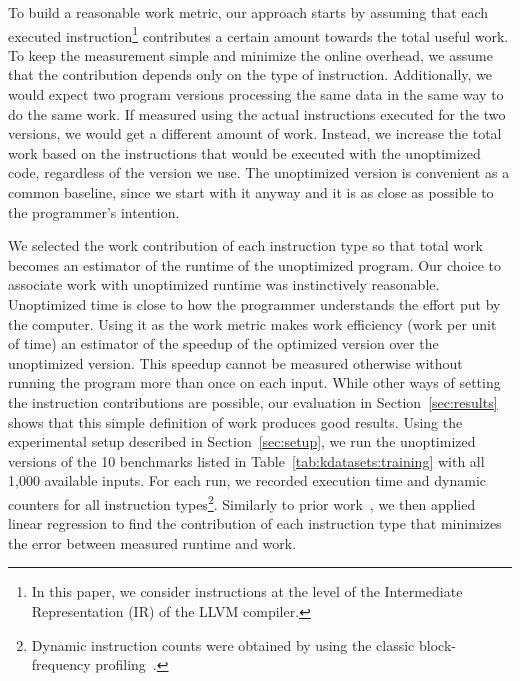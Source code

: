     To build a reasonable work metric, our approach starts by assuming that each executed instruction\footnote{In this paper, we consider instructions at the level of the Intermediate Representation (IR) of the LLVM compiler.} contributes a certain amount towards
    the total useful work. To keep the measurement simple and minimize the online overhead, we assume that the contribution depends only on
    the type of instruction. Additionally, we would expect two program versions processing the same data in the same way to do the same
    work. If measured using the actual instructions executed for the two versions, we would get a different amount of work. Instead, we
    increase the total work based on the instructions that would be executed with the unoptimized code, regardless of the version we use.
    The unoptimized version is convenient as a common baseline, since we start with it anyway and it is as close as possible to the
    programmer's intention.

    We selected the work contribution of each instruction type so that total work becomes an estimator of the runtime of the unoptimized
    program.
    Our choice to associate work with unoptimized runtime was instinctively reasonable.
    Unoptimized time is
    close to how the programmer understands the effort put by the computer. Using it as the work metric makes work efficiency (work per unit
    of time) an estimator of the speedup of the optimized version over the unoptimized version. This speedup cannot be measured otherwise without
    running the program more than once on each input. While other ways of setting the instruction contributions are possible, our evaluation in
    Section~\ref{sec:results} shows that this simple definition of work produces good results.
    Using the experimental setup described in Section~\ref{sec:setup}, we run the unoptimized versions of the 10 benchmarks listed in
    Table~\ref{tab:kdatasets:training} with all 1,000 available inputs. For each run, we recorded execution time and dynamic counters for all instruction types\footnote{
    Dynamic instruction counts were obtained by using the classic block-frequency profiling~\cite{knuth73}.}.
    Similarly to prior work~\cite{giusto01,powell09,brandolese11}, we then applied linear regression to find the contribution of each
    instruction type that minimizes the error between measured runtime and work.

